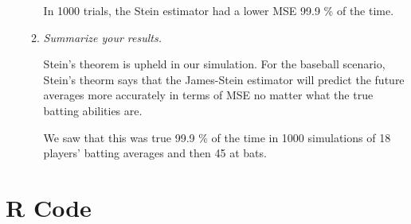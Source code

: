 \documentclass{article}\usepackage[]{graphicx}\usepackage[]{color}
\begin{document}
\begin{enumerate}
\begin{enumerate}
In 1000 trials, the Stein estimator had a lower MSE 99.9 \% of the time.

\item  {\it Summarize your results.}

Stein's theorem is upheld in our simulation. For the baseball scenario, Stein's theorm says that the James-Stein estimator will predict the future averages more accurately in terms of MSE no matter what the true batting abilities are.

We saw that this was true 99.9 \% of the time in 1000 simulations of 18 players' batting averages and then 45 at bats.
\end{enumerate}

\end{enumerate}

\section*{R Code}
\end{document}
